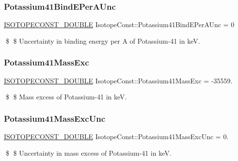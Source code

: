 \subsubsection{\texorpdfstring{Potassium41\+Bind\+E\+Per\+A\+Unc}{Potassium41BindEPerAUnc}}
{\footnotesize\ttfamily \mbox{\hyperlink{group___isotope_const-_macros_ga8f45a7272ce02c0b4c65c44636ed719a}{I\+S\+O\+T\+O\+P\+E\+C\+O\+N\+S\+T\+\_\+\+D\+O\+U\+B\+LE}} Isotope\+Const\+::\+Potassium41\+Bind\+E\+Per\+A\+Unc = 0}

\$ \$ Uncertainty in binding energy per A of Potassium-\/41 in keV. \mbox{\label{group___isotope_const-_potassium-_k41_gaa319395ac1c9acd153bbb1323531b254}} 
\subsubsection{\texorpdfstring{Potassium41\+Mass\+Exc}{Potassium41MassExc}}
{\footnotesize\ttfamily \mbox{\hyperlink{group___isotope_const-_macros_ga8f45a7272ce02c0b4c65c44636ed719a}{I\+S\+O\+T\+O\+P\+E\+C\+O\+N\+S\+T\+\_\+\+D\+O\+U\+B\+LE}} Isotope\+Const\+::\+Potassium41\+Mass\+Exc = -\/35559.}

\$ \$ Mass excess of Potassium-\/41 in keV. \mbox{\label{group___isotope_const-_potassium-_k41_ga636e5487e13c6254eefdcc6fc3171c7f}} 
\subsubsection{\texorpdfstring{Potassium41\+Mass\+Exc\+Unc}{Potassium41MassExcUnc}}
{\footnotesize\ttfamily \mbox{\hyperlink{group___isotope_const-_macros_ga8f45a7272ce02c0b4c65c44636ed719a}{I\+S\+O\+T\+O\+P\+E\+C\+O\+N\+S\+T\+\_\+\+D\+O\+U\+B\+LE}} Isotope\+Const\+::\+Potassium41\+Mass\+Exc\+Unc = 0.}

\$ \$ Uncertainty in mass excess of Potassium-\/41 in keV. \mbox{\label{group___isotope_const-_potassium-_k41_ga51c1817b5c7db95ba0fd64b871a5dd3b}} 
